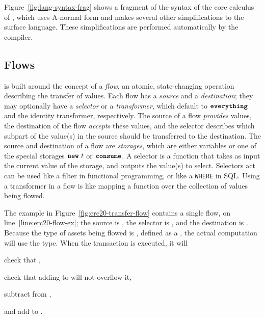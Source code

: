 \documentclass[dvipsnames, usenames, sigconf]{acmart}
\begin{document}
Figure~\ref{fig:lang-syntax-frag} shows a fragment of the syntax of the core calculus of \langName, which uses A-normal form and makes several other simplifications to the surface \langName language.
These simplifications are performed automatically by the compiler.

\subsection{Flows}
\langName is built around the concept of a \emph{flow}, an atomic, state-changing operation describing the transfer of values.
Each flow has a \emph{source} and a \emph{destination}; they may optionally have a \emph{selector} or a \emph{transformer}, which default to $\textbf{\texttt{everything}}$ and the identity transformer, respectively.
The source of a flow \emph{provides} values, the destination of the flow \emph{accepts} these values, and the selector describes which subpart of the value(s) in the source should be transferred to the destination.
The source and destination of a flow are \emph{storages}, which are either variables or one of the special storages $\textbf{\texttt{new}}~t$ or $\textbf{\texttt{consume}}$.
A selector is a function that takes as input the current value of the storage, and outputs the value(s) to select.
Selectors act can be used like a filter in functional programming, or like a \lstinline{WHERE} in SQL.
Using a transformer in a flow is like mapping a function over the collection of values being flowed.

The example in Figure~\ref{fig:erc20-transfer-flow} contains a single flow, on line~\ref{line:erc20-flow-ex}; the source is , the selector is , and the destination is .
Because the type of assets being flowed is , defined as a , the actual computation will use the  type.
When the transaction is executed, it will
\begin{enumerate*}
    \item check that ,
    \item check that adding  to  will not overflow it,
    \item subtract  from ,
    \item and add  to .
\end{enumerate*}
\end{document}

